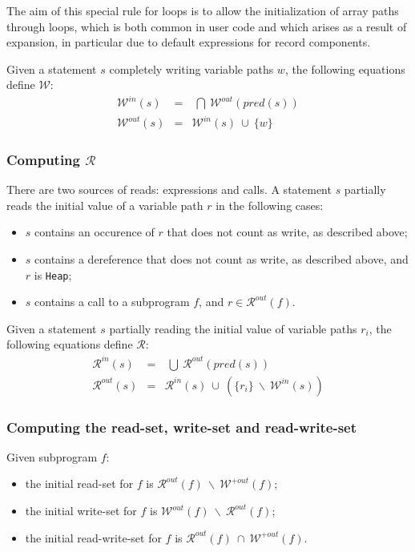 \documentclass{article}
\newcommand{\code}[1]{\texttt{#1}}
\newcommand{\heap}{\code{Heap}\xspace}
\newcommand{\pred}[1]{\ensuremath{\mathit{pred}(#1)}\xspace}
\newcommand{\outallwrites}[1]{\ensuremath{\mathcal{W}^{+out}(#1)}\xspace}
\newcommand{\writes}{$\mathcal{W}$\xspace}
\newcommand{\inwrites}[1]{\ensuremath{\mathcal{W}^{in}(#1)}\xspace}
\newcommand{\outwrites}[1]{\ensuremath{\mathcal{W}^{out}(#1)}\xspace}
\newcommand{\reads}{$\mathcal{R}$\xspace}
\newcommand{\inreads}[1]{\ensuremath{\mathcal{R}^{in}(#1)}\xspace}
\newcommand{\outreads}[1]{\ensuremath{\mathcal{R}^{out}(#1)}\xspace}
\newcommand{\union}{~\cup~}
\newcommand{\bigunion}{~\bigcup~}
\newcommand{\inter}{~\cap~}
\newcommand{\biginter}{~\bigcap~}
\newcommand{\minus}{~\backslash~}
\begin{document}
The aim of this special rule for loops is to allow the initialization of array
paths through loops, which is both common in user code and which arises as a
result of expansion, in particular due to default expressions for record
components.

Given a statement $s$ completely writing variable paths $w$, the following
equations define \writes:
\begin{eqnarray*}
\inwrites{s} &=& \biginter \outwrites{\pred{s}}\\
\outwrites{s} &=& \inwrites{s} \union \{w\}
\end{eqnarray*}

\subsubsection{Computing \reads}

There are two sources of reads: expressions and calls. A statement $s$
partially reads the initial value of a variable path $r$ in the following
cases:
\begin{itemize}
\item $s$ contains an occurence of $r$ that does not count as write, as
  described above;
\item $s$ contains a dereference that does not count as write, as described
  above, and $r$ is \heap;
\item $s$ contains a call to a subprogram $f$, and $r \in \outreads{f}$.
\end{itemize}

Given a statement $s$ partially reading the initial value of variable paths
$r_i$, the following equations define \reads:
\begin{eqnarray*}
\inreads{s} &=& \bigunion \outreads{\pred{s}}\\
\outreads{s} &=& \inreads{s} \union (\{r_i\} \minus \inwrites{s})
\end{eqnarray*}

\subsubsection{Computing the read-set, write-set and read-write-set}

Given subprogram $f$:
\begin{itemize}
\item the initial read-set for $f$ is $\outreads{f} \minus \outallwrites{f}$;
\item the initial write-set for $f$ is $\outwrites{f} \minus \outreads{f}$;
\item the initial read-write-set for $f$ is $\outreads{f} \inter
  \outallwrites{f}$.
\end{itemize}
\end{document}
